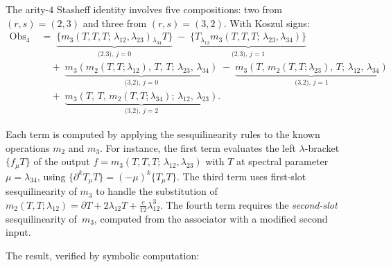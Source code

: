 \documentclass[11pt]{article}
\begin{document}
The arity-$4$ Stasheff identity involves five compositions:
two from $(r,s) = (2,3)$ and three from $(r,s) = (3,2)$.
With Koszul signs:
\begin{align*}
\mathrm{Obs}_4
\;&=\;
\underbrace{\{m_3(T,T,T;\,\lambda_{12},\lambda_{23})
  {}_{\lambda_{34}} T\}}_{\text{(2,3), $j=0$}}
\;-\;
\underbrace{\{T{}_{\lambda_{12}}
  m_3(T,T,T;\,\lambda_{23},\lambda_{34})\}}_{\text{(2,3), $j=1$}}
\\[4pt]
&\quad +\;
\underbrace{m_3(m_2(T,T;\lambda_{12}),\, T,\, T;\,
  \lambda_{23},\, \lambda_{34})}_{\text{(3,2), $j=0$}}
\;-\;
\underbrace{m_3(T,\, m_2(T,T;\lambda_{23}),\, T;\,
  \lambda_{12},\, \lambda_{34})}_{\text{(3,2), $j=1$}}
\\[4pt]
&\quad +\;
\underbrace{m_3(T,\, T,\, m_2(T,T;\lambda_{34});\,
  \lambda_{12},\, \lambda_{23})}_{\text{(3,2), $j=2$}}.
\end{align*}

Each term is computed by applying the sesquilinearity rules
to the known operations $m_2$ and $m_3$.  For instance,
the first term evaluates the left $\lambda$-bracket
$\{f{}_\mu T\}$ of the output
$f = m_3(T,T,T;\,\lambda_{12},\lambda_{23})$ with $T$ at
spectral parameter $\mu = \lambda_{34}$, using
$\{\partial^k T{}_\mu T\} = (-\mu)^k\{T{}_\mu T\}$.
The third term uses first-slot sesquilinearity of $m_3$ to
handle the substitution of $m_2(T,T;\lambda_{12})
= \partial T + 2\lambda_{12} T + \frac{c}{12}\lambda_{12}^3$.
The fourth term requires the \emph{second-slot} sesquilinearity
of~$m_3$, computed from the associator with a modified second input.

The result, verified by symbolic computation:
\end{document}
